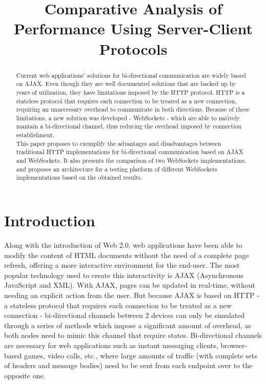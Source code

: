 \documentclass[conference]{IEEEtran}
\begin{document}
\title{Comparative Analysis of Performance Using Server-Client Protocols}

\author{
}

\maketitle

\begin{abstract}
Current web applications' solutions for bi-directional communication are widely
based on AJAX. Even though they are well documented solutions that are backed up by
years of utilization, they have limitations imposed by the HTTP protocol. HTTP
is a stateless protocol that requires each connection to be treated as a new
connection, requiring an unnecessary overhead to communicate in both directions.
Because of these limitations, a new solution was developed - WebSockets -
which are able to natively mantain a bi-directional channel, thus reducing the
overhead imposed by connection establishment.
\\
\indent
This paper proposes to exemplify the advantages and disadvantages between
traditional HTTP implementations for bi-directional communication based on AJAX
and WebSockets. It also presents the comparison of two WebSockets
implementations, and proposes an architecture for a testing platform of
different WebSockets implementations based on the obtained results.
\end{abstract}

\IEEEpeerreviewmaketitle

\section{Introduction}
Along with the introduction of Web 2.0, web applications have been able to
modify the content of HTML documents without the need of a complete page
refresh, offering a more interactive environment for the end-user.
The most popular technology used to create this interactivity is AJAX \cite{AJAX}
(Asynchronous JavaScript and XML). With AJAX, pages can be updated in real-time,
without needing an explicit action from the user. But because AJAX is based on
HTTP - a stateless protocol that requires each connection to be treated as a new
connection - bi-directional channels between 2 devices can only be simulated
through a series of methods which impose a significant amount of overhead, as both
nodes need to mimic this channel that require states.
Bi-directional channels are necessary for web applications such as instant
messaging clients, browser-based games, video calls, etc., where large amounts
of traffic (with complete sets of headers and message bodies) need to be sent from
each endpoint over to the opposite one.
\\
\end{document}
